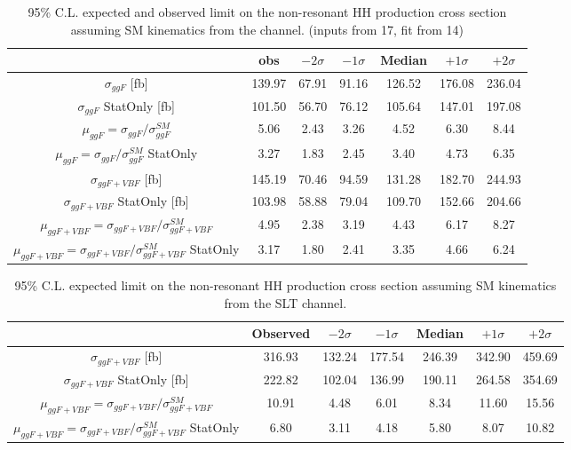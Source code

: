 \begin{table}
\centering
\begin{tabular}{|c|c|c|c|c|c|c|}
\hline
 & obs & $-2\sigma$ & $-1\sigma$ & Median & $+1\sigma$ & $+2\sigma$\\
\hline
$\sigma_{ggF}$ [fb] &  139.97  & 67.91   & 91.16 & 126.52 & 176.08 & 236.04\\
\hline
$\sigma_{ggF}$ StatOnly [fb] & 101.50  & 56.70 &  76.12 & 105.64 & 147.01 & 197.08\\
\hline
$\mu_{ggF}=\sigma_{ggF}/\sigma_{ggF}^{SM}$ & 5.06  & 2.43  & 3.26  & 4.52 & 6.30 &  8.44\\
\hline
$\mu_{ggF}=\sigma_{ggF}/\sigma_{ggF}^{SM}$ StatOnly &  3.27   & 1.83 & 2.45 & 3.40 & 4.73  &  6.35\\
\hline
\hline
$\sigma_{ggF+VBF}$ [fb] & 145.19      & 70.46  & 94.59 & 131.28 &  182.70 & 244.93\\
\hline
$\sigma_{ggF+VBF}$ StatOnly [fb] & 103.98  & 58.88  &  79.04 & 109.70 & 152.66 & 204.66\\
\hline
$\mu_{ggF+VBF}=\sigma_{ggF+VBF}/\sigma_{ggF+VBF}^{SM}$ & 4.95  & 2.38  & 3.19  & 4.43 & 6.17 &  8.27\\
\hline
$\mu_{ggF+VBF}=\sigma_{ggF+VBF}/\sigma_{ggF+VBF}^{SM}$ StatOnly &  3.17   & 1.80 & 2.41 & 3.35  & 4.66  &  6.24\\
\hline
\end{tabular}
\caption{95\% C.L. expected and observed limit on the non-resonant HH production cross section assuming SM kinematics from the \hadhad channel. (inputs from 17, fit from 14)}
\label{sec:fit:tab:SMHadHadLimits}
\end{table}



\begin{table}
\centering
\begin{tabular}{|c|c|c|c|c|c|c|}
\hline
 & Observed & $-2\sigma$ & $-1\sigma$ & Median & $+1\sigma$ & $+2\sigma$\\
\hline
$\sigma_{ggF+VBF}$ [fb] & 316.93  &   132.24  &   177.54   &  246.39  &   342.90  &   459.69 \\ 
\hline
$\sigma_{ggF+VBF}$ StatOnly [fb] & 222.82  &   102.04  &   136.99  &  190.11  &   264.58  &   354.69 \\ 
\hline
$\mu_{ggF+VBF}=\sigma_{ggF+VBF}/\sigma_{ggF+VBF}^{SM}$ & 10.91   &    4.48   &    6.01   &    8.34  &    11.60  &    15.56 \\ 
\hline
$\mu_{ggF+VBF}=\sigma_{ggF+VBF}/\sigma_{ggF+VBF}^{SM}$ StatOnly & 6.80   &    3.11   &    4.18   &    5.80   &    8.07   &   10.82 \\ 
\hline
\end{tabular}
\caption{95\% C.L. expected limit on the non-resonant HH production cross section assuming SM kinematics from the \lephad SLT channel.}
\label{sec:fit:tab:SMLepHadSLTLimits}
\end{table}

